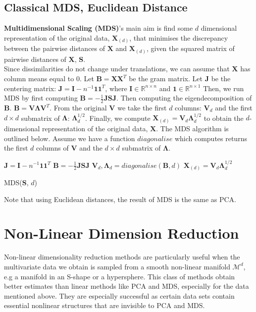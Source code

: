 \documentclass[12pt]{report}
\begin{document}
\subsection{Classical MDS, Euclidean Distance}
\textbf{Multidimensional Scaling (MDS)}'s 
main aim is find some $d$ dimensional representation of the
original data, $\mathbf{X}_{(d)}$,
that minimises the discrepancy between the pairwise distances 
of $\mathbf{X}$ and $\mathbf{X}_{(d)}$, 
given the squared matrix of pairwise distances of $\mathbf{X}$, $\mathbf{S}$.\\
Since dissimilarities do not change under translations, 
we can assume that $\mathbf{X}$ has column means equal to 0. 
Let $\mathbf{B} = \mathbf{X}\mathbf{X}^T$ be the gram matrix.
Let $\mathbf{J}$ be the centering matrix: 
$\mathbf{J} = \mathbf{I} - n^{-1}\mathbf{1}\mathbf{1}^T$, where 
$\mathbf{I} \in \mathbb{R}^{n \times n}$ and $\mathbf{1} \in \mathbb{R}^{n \times 1}$
Then, we run MDS by first computing  
$\mathbf{B} = -\frac{1}{2}\mathbf{J}\mathbf{S}\mathbf{J}$.
Then computing the eigendecomposition of $\mathbf{B}$.
$\mathbf{B} = \mathbf{V}\mathbf{\Lambda}\mathbf{V}^T$. 
From the original $\mathbf{V}$ we take the first $d$ columns: $\mathbf{V}_d$
and the first $d \times d$ submatrix of $\mathbf{\Lambda}$: $\mathbf{\Lambda}^{1/2}_d$.
Finally, we compute
$\mathbf{X}_{(d)} = \mathbf{V}_d\mathbf{\Lambda}^{1/2}_d$ to 
obtain the $d$-dimensional representation of the original data, $\mathbf{X}$. 
The MDS algorithm is outlined below. Assume we have a function $diagonalise$ which
computes returns the first $d$ columns of $\mathbf{V}$ and 
the $d \times d$ submatrix of $\mathbf{\Lambda}$.\\
\begin{algorithm}
    $\mathbf{J} = \mathbf{I} - n^{-1}\mathbf{1}\mathbf{1}^T$\;
    $\mathbf{B} = -\frac{1}{2}\mathbf{J}\mathbf{S}\mathbf{J}$\;
    $\mathbf{V}_d, \mathbf{\Lambda}_d = diagonalise(\mathbf{B}, d)$\;
    $\mathbf{X}_{(d)} = \mathbf{V}_d\mathbf{\Lambda}^{1/2}_d$\;
    \caption{MDS($\mathbf{S}$, $d$)}
\end{algorithm}
Note that using Euclidean distances, the result of MDS is the same as PCA.
\newpage
\section{Non-Linear Dimension Reduction}

Non-linear dimensionality reduction methods are particularly useful 
when the multivariate data we obtain is sampled 
from a smooth non-linear manifold $\mathcal{M}^d$, 
e.g a manifold in an S-shape or a hypersphere. 
This class of methods obtain better estimates than linear methods like PCA and MDS,
especially for the data mentioned above. 
They are especially successful as certain data sets contain 
essential nonlinear structures that are invisible to PCA and MDS.
\end{document}
